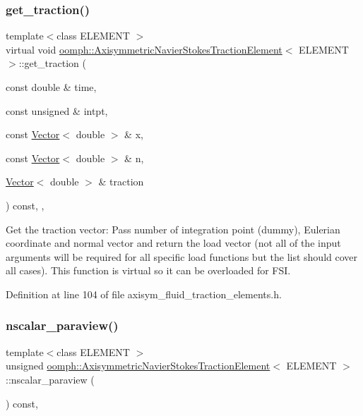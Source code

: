 \subsubsection{\texorpdfstring{get\+\_\+traction()}{get\_traction()}}
{\footnotesize\ttfamily template$<$class E\+L\+E\+M\+E\+NT $>$ \\
virtual void \hyperlink{classoomph_1_1AxisymmetricNavierStokesTractionElement}{oomph\+::\+Axisymmetric\+Navier\+Stokes\+Traction\+Element}$<$ E\+L\+E\+M\+E\+NT $>$\+::get\+\_\+traction (\begin{DoxyParamCaption}\item[{const double \&}]{time,  }\item[{const unsigned \&}]{intpt,  }\item[{const \hyperlink{classoomph_1_1Vector}{Vector}$<$ double $>$ \&}]{x,  }\item[{const \hyperlink{classoomph_1_1Vector}{Vector}$<$ double $>$ \&}]{n,  }\item[{\hyperlink{classoomph_1_1Vector}{Vector}$<$ double $>$ \&}]{traction }\end{DoxyParamCaption}) const\hspace{0.3cm}{\ttfamily [inline]}, {\ttfamily [protected]}, {\ttfamily [virtual]}}



Get the traction vector\+: Pass number of integration point (dummy), Eulerian coordinate and normal vector and return the load vector (not all of the input arguments will be required for all specific load functions but the list should cover all cases). This function is virtual so it can be overloaded for F\+SI. 



Definition at line 104 of file axisym\+\_\+fluid\+\_\+traction\+\_\+elements.\+h.

\mbox{\label{classoomph_1_1AxisymmetricNavierStokesTractionElement_a31a8ab8cc6b231e524ba0329b0cb7e78}} 
\subsubsection{\texorpdfstring{nscalar\+\_\+paraview()}{nscalar\_paraview()}}
{\footnotesize\ttfamily template$<$class E\+L\+E\+M\+E\+NT $>$ \\
unsigned \hyperlink{classoomph_1_1AxisymmetricNavierStokesTractionElement}{oomph\+::\+Axisymmetric\+Navier\+Stokes\+Traction\+Element}$<$ E\+L\+E\+M\+E\+NT $>$\+::nscalar\+\_\+paraview (\begin{DoxyParamCaption}{ }\end{DoxyParamCaption}) const\hspace{0.3cm}{\ttfamily [inline]}, {\ttfamily [virtual]}}



